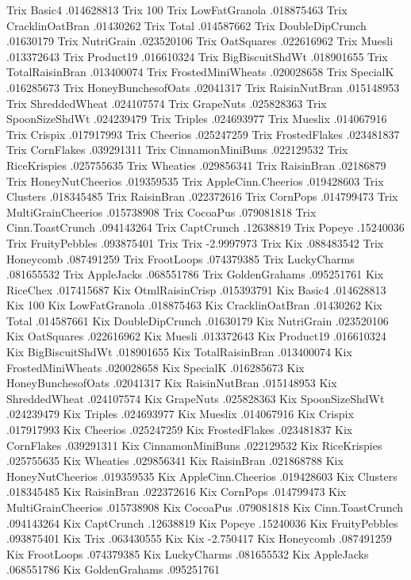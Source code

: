 Trix	Basic4	.014628813
Trix	100%
Trix	LowFatGranola	.018875463
Trix	CracklinOatBran	.01430262
Trix	Total	.014587662
Trix	DoubleDipCrunch	.01630179
Trix	NutriGrain	.023520106
Trix	OatSquares	.022616962
Trix	Muesli	.013372643
Trix	Product19	.016610324
Trix	BigBiscuitShdWt	.018901655
Trix	TotalRaisinBran	.013400074
Trix	FrostedMiniWheats	.020028658
Trix	SpecialK	.016285673
Trix	HoneyBunchesofOats	.02041317
Trix	RaisinNutBran	.015148953
Trix	ShreddedWheat	.024107574
Trix	GrapeNuts	.025828363
Trix	SpoonSizeShdWt	.024239479
Trix	Triples	.024693977
Trix	Mueslix	.014067916
Trix	Crispix	.017917993
Trix	Cheerios	.025247259
Trix	FrostedFlakes	.023481837
Trix	CornFlakes	.039291311
Trix	CinnamonMiniBuns	.022129532
Trix	RiceKrispies	.025755635
Trix	Wheaties	.029856341
Trix	RaisinBran	.02186879
Trix	HoneyNutCheerios	.019359535
Trix	AppleCinn.Cheerios	.019428603
Trix	Clusters	.018345485
Trix	RaisinBran	.022372616
Trix	CornPops	.014799473
Trix	MultiGrainCheerios	.015738908
Trix	CocoaPus	.079081818
Trix	Cinn.ToastCrunch	.094143264
Trix	CaptCrunch	.12638819
Trix	Popeye	.15240036
Trix	FruityPebbles	.093875401
Trix	Trix	-2.9997973
Trix	Kix	.088483542
Trix	Honeycomb	.087491259
Trix	FrootLoops	.074379385
Trix	LuckyCharms	.081655532
Trix	AppleJacks	.068551786
Trix	GoldenGrahams	.095251761
Kix	RiceChex	.017415687
Kix	OtmlRaisinCrisp	.015393791
Kix	Basic4	.014628813
Kix	100%
Kix	LowFatGranola	.018875463
Kix	CracklinOatBran	.01430262
Kix	Total	.014587661
Kix	DoubleDipCrunch	.01630179
Kix	NutriGrain	.023520106
Kix	OatSquares	.022616962
Kix	Muesli	.013372643
Kix	Product19	.016610324
Kix	BigBiscuitShdWt	.018901655
Kix	TotalRaisinBran	.013400074
Kix	FrostedMiniWheats	.020028658
Kix	SpecialK	.016285673
Kix	HoneyBunchesofOats	.02041317
Kix	RaisinNutBran	.015148953
Kix	ShreddedWheat	.024107574
Kix	GrapeNuts	.025828363
Kix	SpoonSizeShdWt	.024239479
Kix	Triples	.024693977
Kix	Mueslix	.014067916
Kix	Crispix	.017917993
Kix	Cheerios	.025247259
Kix	FrostedFlakes	.023481837
Kix	CornFlakes	.039291311
Kix	CinnamonMiniBuns	.022129532
Kix	RiceKrispies	.025755635
Kix	Wheaties	.029856341
Kix	RaisinBran	.021868788
Kix	HoneyNutCheerios	.019359535
Kix	AppleCinn.Cheerios	.019428603
Kix	Clusters	.018345485
Kix	RaisinBran	.022372616
Kix	CornPops	.014799473
Kix	MultiGrainCheerios	.015738908
Kix	CocoaPus	.079081818
Kix	Cinn.ToastCrunch	.094143264
Kix	CaptCrunch	.12638819
Kix	Popeye	.15240036
Kix	FruityPebbles	.093875401
Kix	Trix	.063430555
Kix	Kix	-2.750417
Kix	Honeycomb	.087491259
Kix	FrootLoops	.074379385
Kix	LuckyCharms	.081655532
Kix	AppleJacks	.068551786
Kix	GoldenGrahams	.095251761
